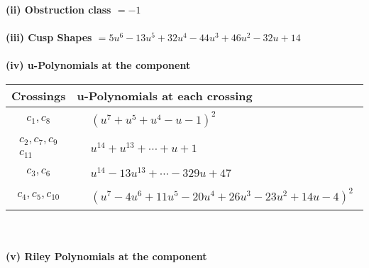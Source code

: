 \documentclass[1p]{elsarticle_modified}
\theoremstyle{definition}
\begin{document}
\flushleft \textbf{(ii) Obstruction class $= -1$}\\~\\
\flushleft \textbf{(iii) Cusp Shapes $= 5 u^6-13 u^5+32 u^4-44 u^3+46 u^2-32 u+14$}\\~\\
\newpage\renewcommand{\arraystretch}{1}
\flushleft \textbf{(iv) u-Polynomials at the component}\newline \\
\begin{tabular}{m{50pt}|m{274pt}}
Crossings & \hspace{64pt}u-Polynomials at each crossing \\
\hline $$\begin{aligned}c_{1},c_{8}\end{aligned}$$&$\begin{aligned}
&(u^7+u^5+u^4- u-1)^2
\end{aligned}$\\
\hline $$\begin{aligned}c_{2},c_{7},c_{9}\\c_{11}\end{aligned}$$&$\begin{aligned}
&u^{14}+u^{13}+\cdots+u+1
\end{aligned}$\\
\hline $$\begin{aligned}c_{3},c_{6}\end{aligned}$$&$\begin{aligned}
&u^{14}-13 u^{13}+\cdots-329 u+47
\end{aligned}$\\
\hline $$\begin{aligned}c_{4},c_{5},c_{10}\end{aligned}$$&$\begin{aligned}
&(u^7-4 u^6+11 u^5-20 u^4+26 u^3-23 u^2+14 u-4)^2
\end{aligned}$\\
\hline
\end{tabular}\\~\\
\newpage\renewcommand{\arraystretch}{1}
\flushleft \textbf{(v) Riley Polynomials at the component}\newline \\
\end{document}
